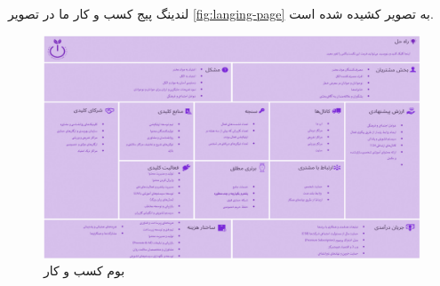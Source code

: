 \documentclass[dvipsnames, svgnames, x11names, 11pt]{article}
\begin{document}
\section{}
لندینگ پیج کسب و کار ما در تصویر 
\ref{fig:langing-page}
به تصویر کشیده شده است.

\begin{figure}[b]
\begin{center}
\includegraphics[scale=0.7, angle=90]{images/canvas1}
\end{center}
\caption{بوم کسب و کار}
\label{fig:lean-canvas}
\end{figure}
\end{document}

